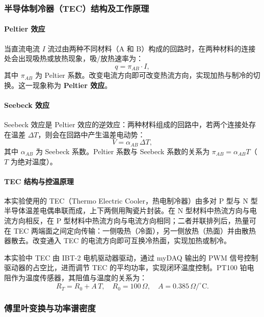 \documentclass[dvipsnames, svgnames,a4paper,11pt]{article}
\begin{document}
\subsubsection{半导体制冷器（TEC）结构及工作原理}

\paragraph{Peltier 效应}
当直流电流 $I$ 流过由两种不同材料（A 和 B）构成的回路时，在两种材料的连接处会出现吸热或放热现象，吸/放热速率为：
\begin{equation}
	q = \pi_{AB}\cdot I,
\end{equation}
其中 $\pi_{AB}$ 为 Peltier 系数。改变电流方向即可改变热流方向，实现加热与制冷的切换。这一现象称为 \textbf{Peltier 效应}。

\paragraph{Seebeck 效应}
Seebeck 效应是 Peltier 效应的逆效应：两种材料组成的回路中，若两个连接处存在温差 $\Delta T$，则会在回路中产生温差电动势：
\begin{equation}
	V = \alpha_{AB}\,\Delta T,
\end{equation}
其中 $\alpha_{AB}$ 为 Seebeck 系数。Peltier 系数与 Seebeck 系数的关系为 $\pi_{AB}=\alpha_{AB}T$（$T$ 为绝对温度）。

\paragraph{TEC 结构与控温原理}
本实验使用的 TEC（Thermo Electric Cooler，热电制冷器）由多对 P 型与 N 型半导体温差电偶串联而成，上下两侧用陶瓷片封装。在 N 型材料中热流方向与电流方向相反，在 P 型材料中热流方向与电流方向相同；二者并联排列后，热量可在 TEC 两端面之间定向传输：一侧吸热（冷面），另一侧放热（热面）并由散热器散去。改变通入 TEC 的电流方向即可互换冷热面，实现加热或制冷。

本实验中 TEC 由 IBT-2 电机驱动器驱动，通过 myDAQ 输出的 PWM 信号控制驱动器的占空比，进而调节 TEC 的平均功率，实现闭环温度控制。PT100 铂电阻作为温度传感器，其阻值与温度的关系为：
\begin{equation}
	R_T = R_0 + A\,T, \quad R_0=100\,\Omega,\quad A=0.385\,\Omega/^\circ\mathrm{C}.
\end{equation}


\subsubsection{傅里叶变换与功率谱密度}
\end{document}
